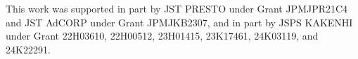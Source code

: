 This work was supported in part by JST PRESTO under Grant JPMJPR21C4 and JST AdCORP under Grant JPMJKB2307, and in part by JSPS KAKENHI under Grant 22H03610, 22H00512, 23H01415, 23K17461, 24K03119, and 24K22291.